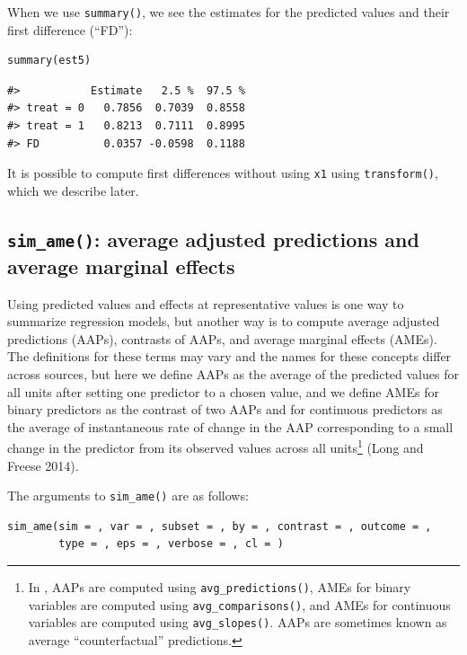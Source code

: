 When we use \texttt{summary()}, we see the estimates for the predicted values and their first difference (``FD''):

\begin{verbatim}
summary(est5)
\end{verbatim}

\begin{verbatim}
#>           Estimate   2.5 %  97.5 %
#> treat = 0   0.7856  0.7039  0.8558
#> treat = 1   0.8213  0.7111  0.8995
#> FD          0.0357 -0.0598  0.1188
\end{verbatim}

It is possible to compute first differences without using \texttt{x1} using \texttt{transform()}, which we describe later.

\hypertarget{sim_ame-average-adjusted-predictions-and-average-marginal-effects}{%
\subsection{\texorpdfstring{\texttt{sim\_ame()}: average adjusted predictions and average marginal effects}{sim\_ame(): average adjusted predictions and average marginal effects}}\label{sim_ame-average-adjusted-predictions-and-average-marginal-effects}}

Using predicted values and effects at representative values is one way to summarize regression models, but another way is to compute average adjusted predictions (AAPs), contrasts of AAPs, and average marginal effects (AMEs). The definitions for these terms may vary and the names for these concepts differ across sources, but here we define AAPs as the average of the predicted values for all units after setting one predictor to a chosen value, and we define AMEs for binary predictors as the contrast of two AAPs and for continuous predictors as the average of instantaneous rate of change in the AAP corresponding to a small change in the predictor from its observed values across all units\footnote{In , AAPs are computed using \texttt{avg\_predictions()}, AMEs for binary variables are computed using \texttt{avg\_comparisons()}, and AMEs for continuous variables are computed using \texttt{avg\_slopes()}. AAPs are sometimes known as average ``counterfactual'' predictions.} (Long and Freese 2014).

The arguments to \texttt{sim\_ame()} are as follows:

\begin{verbatim}
sim_ame(sim = , var = , subset = , by = , contrast = , outcome = ,
        type = , eps = , verbose = , cl = )
\end{verbatim}

